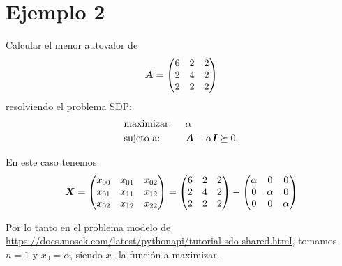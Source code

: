 \documentclass[11pt]{article}
\begin{document}
\section{Ejemplo 2}

Calcular el menor autovalor de
$$\bm{A} =
\begin{pmatrix}
6 & 2 & 2 \\
2 & 4 & 2 \\
2 & 2 & 2
\end{pmatrix}
$$
resolviendo el problema SDP:
\begin{alignat*}{2}
  & \text{maximizar: } & & \alpha \\
  & \text{sujeto a: } & & \bm{A} - \alpha \bm{I}  \succeq 0.
\end{alignat*}


En este caso tenemos
$$
\bm{X} =
\begin{pmatrix}
x_{00} & x_{01} & x_{02} \\
x_{01} & x_{11} & x_{12} \\
x_{02} & x_{12} & x_{22}
\end{pmatrix} = \begin{pmatrix}
6 & 2 & 2 \\
2 & 4 & 2 \\
2 & 2 & 2
\end{pmatrix}
- \begin{pmatrix}
\alpha & 0 & 0 \\
0 & \alpha & 0 \\
0 & 0 & \alpha
\end{pmatrix}
$$

Por lo tanto en el problema modelo de \url{https://docs.mosek.com/latest/pythonapi/tutorial-sdo-shared.html}, tomamos $n=1$ y $x_0 = \alpha$, siendo $x_0$ la función a maximizar.
\end{document}
